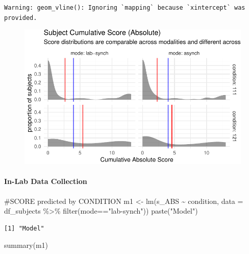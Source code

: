 \documentclass[
  letterpaper,
  DIV=11,
  numbers=noendperiod]{scrreprt}
\let\oldparagraph\paragraph
\renewcommand{\paragraph}[1]{\oldparagraph{#1}\mbox{}}
\newenvironment{Shaded}{\begin{snugshade}}{\end{snugshade}}
\newcommand{\AttributeTok}[1]{\textcolor[rgb]{0.40,0.45,0.13}{#1}}
\newcommand{\CommentTok}[1]{\textcolor[rgb]{0.37,0.37,0.37}{#1}}
\newcommand{\FunctionTok}[1]{\textcolor[rgb]{0.28,0.35,0.67}{#1}}
\newcommand{\NormalTok}[1]{\textcolor[rgb]{0.00,0.23,0.31}{#1}}
\newcommand{\OtherTok}[1]{\textcolor[rgb]{0.00,0.23,0.31}{#1}}
\newcommand{\SpecialCharTok}[1]{\textcolor[rgb]{0.37,0.37,0.37}{#1}}
\newcommand{\StringTok}[1]{\textcolor[rgb]{0.13,0.47,0.30}{#1}}
\begin{document}
\begin{verbatim}
Warning: geom_vline(): Ignoring `mapping` because `xintercept` was provided.
\end{verbatim}

\begin{figure}[H]

{\centering \includegraphics{analysis/SGC3A/4_sgc3A_hypotesting_files/figure-pdf/VIS-SUBJECT-ABS-1.pdf}

}

\end{figure}

\hypertarget{in-lab-data-collection}{%
\paragraph{In-Lab Data Collection}\label{in-lab-data-collection}}

\begin{Shaded}
\begin{Highlighting}[]
\CommentTok{\#SCORE predicted by CONDITION}
\NormalTok{m1 }\OtherTok{\textless{}{-}} \FunctionTok{lm}\NormalTok{(s\_ABS }\SpecialCharTok{\textasciitilde{}}\NormalTok{ condition, }\AttributeTok{data =}\NormalTok{ df\_subjects }\SpecialCharTok{\%\textgreater{}\%} \FunctionTok{filter}\NormalTok{(mode}\SpecialCharTok{==}\StringTok{"lab{-}synch"}\NormalTok{))}
\FunctionTok{paste}\NormalTok{(}\StringTok{"Model"}\NormalTok{)}
\end{Highlighting}
\end{Shaded}

\begin{verbatim}
[1] "Model"
\end{verbatim}

\begin{Shaded}
\begin{Highlighting}[]
\FunctionTok{summary}\NormalTok{(m1)}
\end{Highlighting}
\end{Shaded}
\end{document}
